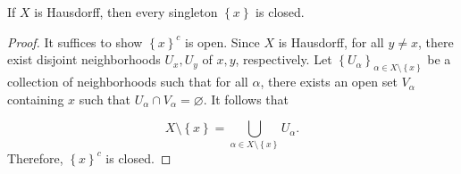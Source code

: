 \begin{proposition}\label{prp:1.4}
	If $X$ is Hausdorff, then every singleton $\left\{ x \right\} $ is closed.
\end{proposition}
\begin{proof}
	It suffices to show $\left\{ x \right\}^{c} $ is open. Since $X$ is Hausdorff, for all $y\neq x$, there exist disjoint neighborhoods $U_x,U_y$ of $x,y$, respectively. Let $\left\{ U_\alpha  \right\}_{\alpha \in X\setminus \left\{ x \right\} } $ be a collection of neighborhoods such that for all $\alpha $, there exists an open set $V_\alpha  $ containing $x$ such that $U_\alpha \cap V_\alpha =\varnothing $. It follows that

	\[
		X\setminus \left\{ x \right\} =\bigcup_{\alpha \in X\setminus \left\{ x \right\} } U_\alpha 
	.\]
	Therefore, $\left\{ x \right\} ^{c} $ is closed.
\end{proof}
